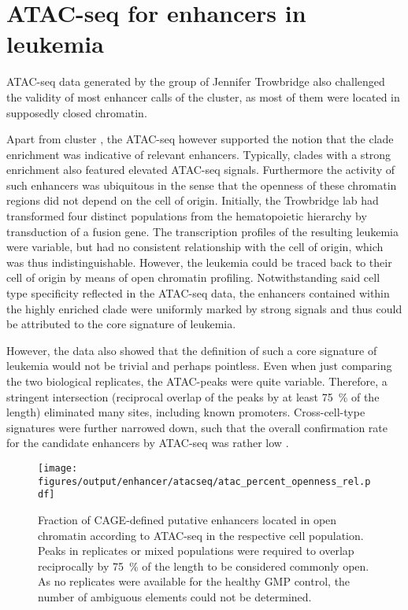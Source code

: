 \label{chap:r:enhancers:amitend}
\section{ATAC-seq for enhancers in \mllafnine leukemia}
\label{chap:r:enhancers:cluster:clades:clearydata}
 
ATAC-seq data generated by the group of Jennifer Trowbridge\cite{George2016} also challenged the validity of most enhancer calls of the \amitten cluster, as most of them were located in supposedly closed chromatin.\label{chap:r:enhancers:trowbridgestart} 

Apart from cluster , the ATAC-seq however supported the notion that the clade enrichment was indicative of relevant enhancers. Typically, clades with a strong enrichment also featured elevated ATAC-seq signals. Furthermore the activity of such enhancers was ubiquitous in the sense that the openness of these chromatin regions did not depend on the cell of origin. Initially, the Trowbridge lab had transformed four distinct populations from the hematopoietic hierarchy by transduction of a \mllafnine fusion gene. The transcription profiles of the resulting leukemia were variable, but had no consistent relationship with the cell of origin, which was thus indistinguishable. However, the leukemia could be traced back to their cell of origin by means of open chromatin profiling\cite{George2016}. Notwithstanding said cell type specificity reflected in the ATAC-seq data, the enhancers contained within the highly enriched clade were uniformly marked by strong signals and thus could be attributed to the core signature of \mllafnine leukemia.

However, the data also showed that the definition of such a core signature of \mllafnine leukemia would not be trivial and perhaps pointless. Even when just comparing the two biological replicates, the ATAC-peaks were quite variable. Therefore, a stringent intersection (reciprocal overlap of the peaks by at least \SI{75}{\percent} of the length) eliminated many sites, including known promoters\dns. Cross-cell-type signatures were further narrowed down, such that the overall confirmation rate for the candidate enhancers by ATAC-seq was rather low . 

 \begin{figure}[!bht]
 	\texttt{[image: figures/output/enhancer/atacseq/atac\_percent\_openness\_rel.pdf]}
 	\caption{Fraction of CAGE-defined putative enhancers located in open chromatin according to ATAC-seq in the respective cell population. Peaks in replicates or mixed populations were required to overlap reciprocally by \SI{75}{\percent} of the length to be considered commonly open. As no replicates were available for the healthy GMP control, the number of ambiguous elements could not be determined.}
 	\label{fig:enhancers:trowbridge_atac_percent_openness_rel}
 \end{figure}
 
